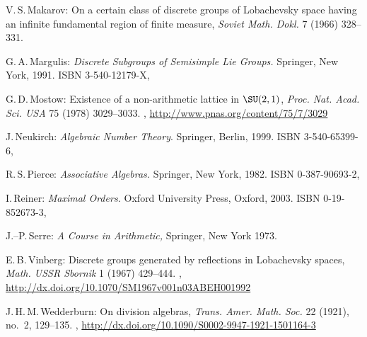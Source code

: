 \begin{references}{99}
 V.\,S.\,Makarov:
 On a certain class of discrete groups of Lobachevsky space
having an infinite fundamental region of finite measure,
 \emph{Soviet Math. Dokl.} 7 (1966) 328--331.

 G.\,A.\,Margulis:
 \emph{Discrete Subgroups of Semisimple Lie Groups.}
 Springer, {New York}, 1991.
 ISBN 3-540-12179-X,

 G.\,D.\,Mostow:
 Existence of a non-arithmetic lattice in $\SU(2,1)$,
 \emph{Proc. Nat. Acad. Sci. USA} 75 (1978) 3029--3033.
,
\url{http://www.pnas.org/content/75/7/3029}

J.\,Neukirch:
\emph{Algebraic Number Theory}. 
Springer, Berlin, 1999.
 ISBN 3-540-65399-6,
 
R.\,S.\,Pierce:
 \emph{Associative Algebras.}
 Springer, New York, 1982.
 ISBN 0-387-90693-2,
 
 I.\,Reiner:
 \emph{Maximal Orders.}
 Oxford University Press, Oxford, 2003. 
 ISBN 0-19-852673-3,

 J.--P.\,Serre:
 \emph{A Course in Arithmetic,}
 Springer, New York 1973.

 E.\,B.\,Vinberg:
 Discrete groups generated by reflections in Lobachevsky
spaces,
 \emph{Math. USSR Sbornik} 1 (1967) 429--444.
 ,
 \maynewline
 \url{http://dx.doi.org/10.1070/SM1967v001n03ABEH001992}

J.\,H.\,M.\,Wedderburn:
On division algebras,
\emph{Trans. Amer. Math. Soc.} 22 (1921), no.~2, 129--135. 
,
\url{http://dx.doi.org/10.1090/S0002-9947-1921-1501164-3}

 \end{references}




